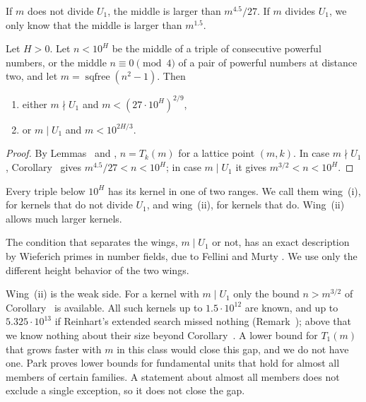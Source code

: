 \inwords If $m$ does not divide $U_1$, the middle is larger than $m^{4.5}/27$. If $m$ divides $U_1$, we only know that the middle is
larger than $m^{1.5}$.

\begin{corollary}
Let $H > 0$. Let $n < 10^H$ be the middle of a triple of consecutive powerful numbers, or the middle $n \equiv 0 \pmod 4$ of a pair of
powerful numbers at distance two, and let $m = \operatorname{sqfree}(n^2 - 1)$. Then
\begin{enumerate}
  \item[(i)] either $m \nmid U_1$ and $m < (27 \cdot 10^H)^{2/9}$,
  \item[(ii)] or $m \mid U_1$ and $m < 10^{2H/3}$.
\end{enumerate}
\end{corollary}

\begin{proof}
By Lemmas~ and , $n = T_k(m)$ for a lattice point $(m, k)$. In case $m \nmid U_1$,
Corollary~ gives $m^{4.5}/27 < n < 10^H$; in case $m \mid U_1$ it gives $m^{3/2} < n < 10^H$.
\end{proof}

\inwords Every triple below $10^H$ has its kernel in one of two ranges. We call them wing~(i), for kernels that do not divide $U_1$, and
wing~(ii), for kernels that do. Wing~(ii) allows much larger kernels.

The condition that separates the wings, $m \mid U_1$ or not, has an exact description by Wieferich primes in number fields, due to Fellini
and Murty \cite[Theorem~1.1]{FelliniMurty2026}. We use only the different height behavior of the two wings.

Wing~(ii) is the weak side. For a kernel with $m \mid U_1$ only the bound $n > m^{3/2}$ of Corollary~ is available. All such
kernels up to $1.5 \cdot 10^{12}$ are known, and up to $5.325 \cdot 10^{13}$ if Reinhart's extended search missed nothing
(Remark~); above that we know nothing about their size beyond Corollary~. A lower bound for $T_1(m)$ that grows faster with $m$ in this class would close this gap, and we do not have one.
Park \cite{Park2012} proves lower bounds for fundamental units that hold for almost all members of certain families. A statement about almost
all members does not exclude a single exception, so it does not close the gap.

